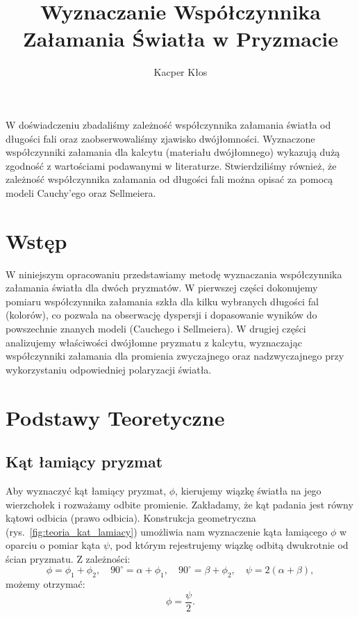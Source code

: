 \documentclass[12pt]{article}
\title{Wyznaczanie Współczynnika Załamania Światła w Pryzmacie}
\author{Kacper Kłos}
\begin{document}
\maketitle

W doświadczeniu zbadaliśmy zależność współczynnika załamania światła od długości fali oraz zaobserwowaliśmy zjawisko dwójłomności.
Wyznaczone współczynniki załamania dla kalcytu (materiału dwójłomnego) wykazują dużą zgodność z wartościami podawanymi w literaturze.
Stwierdziliśmy również, że zależność współczynnika załamania od długości fali można opisać za pomocą modeli Cauchy'ego oraz Sellmeiera.

\newpage

\section{Wstęp}
W niniejszym opracowaniu przedstawiamy metodę wyznaczania współczynnika załamania światła dla dwóch pryzmatów.  
W pierwszej części dokonujemy pomiaru współczynnika załamania szkła dla kilku wybranych długości fal (kolorów), co pozwala na obserwację dyspersji i dopasowanie wyników do powszechnie znanych modeli (Cauchego i Sellmeiera).  
W drugiej części analizujemy właściwości dwójłomne pryzmatu z kalcytu, wyznaczając współczynniki załamania dla promienia zwyczajnego oraz nadzwyczajnego przy wykorzystaniu odpowiedniej polaryzacji światła.
\section{Podstawy Teoretyczne}
\subsection{Kąt łamiący pryzmat}
Aby wyznaczyć kąt łamiący pryzmat, $\phi$, kierujemy wiązkę światła na jego wierzchołek i rozważamy odbite promienie. Zakładamy, że kąt padania jest równy kątowi odbicia (prawo odbicia).  
Konstrukcja geometryczna (rys.~\ref{fig:teoria_kat_lamiacy}) umożliwia nam wyznaczenie kąta łamiącego $\phi$ w oparciu o pomiar kąta $\psi$, pod którym rejestrujemy wiązkę odbitą dwukrotnie od ścian pryzmatu.  
Z zależności:
\[
    \phi = \phi_1 + \phi_2,\quad
    90^\circ = \alpha + \phi_{1},\quad 
    90^\circ = \beta + \phi_{2},\quad
    \psi = 2(\alpha + \beta),
\]
możemy otrzymać:
\[
    \phi = \frac{\psi}{2}.
\]
\end{document}
